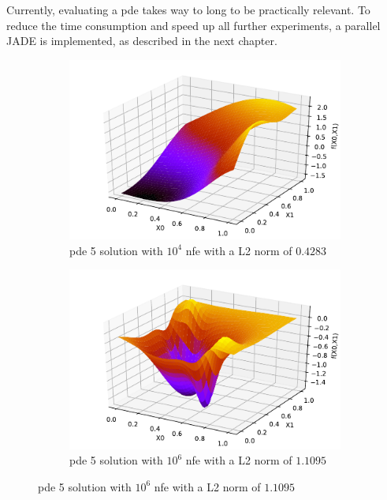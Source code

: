 \documentclass[./\jobname.tex]{subfiles}
\begin{document}
Currently, evaluating a \gls{pde} takes way to long to be practically relevant. To reduce the time consumption and speed up all further experiments, a parallel JADE is implemented, as described in the next chapter.  

\begin{figure}[h]
	\centering
	\begin{subfigure}[b]{0.5\linewidth}
		\centering
		\includegraphics[width=1\textwidth]{../../code/experiments/experiment_0/pde5_best_sol_10_4.pdf}
		\caption{\gls{pde} 5 solution with $10^4$ \gls{nfe} with a L2 norm of $0.4283$}
		\label{fig:pde5_sol_10_4}
	\end{subfigure}%
	\begin{subfigure}[b]{0.5\linewidth}
		\centering
		\includegraphics[width=1\textwidth]{../../code/experiments/experiment_0/pde5_best_sol_10_6.pdf}
		\caption{\gls{pde} 5 solution with $10^6$ \gls{nfe} with a L2 norm of $1.1095$}
		\label{fig:pde5_sol_10_6}
	\end{subfigure}%
	\label{fig:serial_jade_pde5_sol_comparison}
\end{figure}
\end{document}

